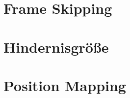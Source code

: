 \section{Frame Skipping}
\label{sec:frame_skipping}

\section{Hindernisgröße}
\label{sec:hindernisgroesse}

\section{Position Mapping}
\label{sec:position_mapping}

